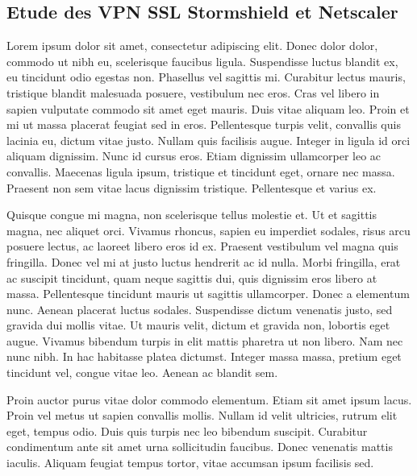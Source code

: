 \documentclass[a4paper,12pt]{report}
\begin{document}
\subsection{Etude des VPN SSL Stormshield et Netscaler} %
Lorem ipsum dolor sit amet, consectetur adipiscing elit. Donec dolor dolor, commodo ut nibh eu, scelerisque faucibus ligula. Suspendisse luctus blandit ex, eu tincidunt odio egestas non. Phasellus vel sagittis mi. Curabitur lectus mauris, tristique blandit malesuada posuere, vestibulum nec eros. Cras vel libero in sapien vulputate commodo sit amet eget mauris. Duis vitae aliquam leo. Proin et mi ut massa placerat feugiat sed in eros. Pellentesque turpis velit, convallis quis lacinia eu, dictum vitae justo. Nullam quis facilisis augue. Integer in ligula id orci aliquam dignissim. Nunc id cursus eros. Etiam dignissim ullamcorper leo ac convallis. Maecenas ligula ipsum, tristique et tincidunt eget, ornare nec massa. Praesent non sem vitae lacus dignissim tristique. Pellentesque et varius ex.

Quisque congue mi magna, non scelerisque tellus molestie et. Ut et sagittis magna, nec aliquet orci. Vivamus rhoncus, sapien eu imperdiet sodales, risus arcu posuere lectus, ac laoreet libero eros id ex. Praesent vestibulum vel magna quis fringilla. Donec vel mi at justo luctus hendrerit ac id nulla. Morbi fringilla, erat ac suscipit tincidunt, quam neque sagittis dui, quis dignissim eros libero at massa. Pellentesque tincidunt mauris ut sagittis ullamcorper. Donec a elementum nunc. Aenean placerat luctus sodales. Suspendisse dictum venenatis justo, sed gravida dui mollis vitae. Ut mauris velit, dictum et gravida non, lobortis eget augue. Vivamus bibendum turpis in elit mattis pharetra ut non libero. Nam nec nunc nibh. In hac habitasse platea dictumst. Integer massa massa, pretium eget tincidunt vel, congue vitae leo. Aenean ac blandit sem.

Proin auctor purus vitae dolor commodo elementum. Etiam sit amet ipsum lacus. Proin vel metus ut sapien convallis mollis. Nullam id velit ultricies, rutrum elit eget, tempus odio. Duis quis turpis nec leo bibendum suscipit. Curabitur condimentum ante sit amet urna sollicitudin faucibus. Donec venenatis mattis iaculis. Aliquam feugiat tempus tortor, vitae accumsan ipsum facilisis sed.

\end{document}
